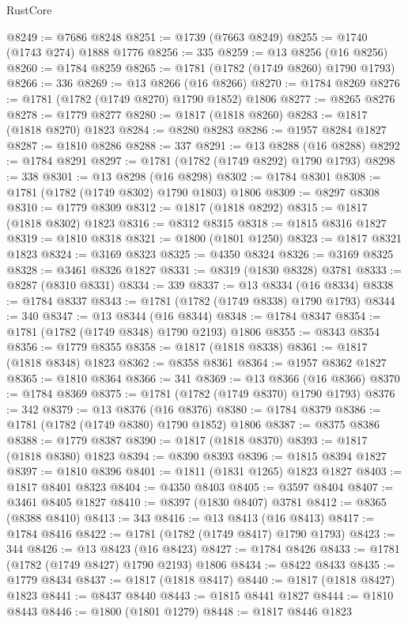 \begin{lexlean}{RustCore}
\begin{coremodule}
@8249 := @7686 @8248
@8251 := @1739 (@7663 @8249)
@8255 := @1740 (@1743 @274) @1888 @1776
@8256 := 335
@8259 := @13 @8256 (@16 @8256)
@8260 := @1784 @8259
@8265 := @1781 (@1782 (@1749 @8260) @1790 @1793)
@8266 := 336
@8269 := @13 @8266 (@16 @8266)
@8270 := @1784 @8269
@8276 := @1781 (@1782 (@1749 @8270) @1790 @1852) @1806
@8277 := @8265 @8276
@8278 := @1779 @8277
@8280 := @1817 (@1818 @8260)
@8283 := @1817 (@1818 @8270) @1823
@8284 := @8280 @8283
@8286 := @1957 @8284 @1827
@8287 := @1810 @8286
@8288 := 337
@8291 := @13 @8288 (@16 @8288)
@8292 := @1784 @8291
@8297 := @1781 (@1782 (@1749 @8292) @1790 @1793)
@8298 := 338
@8301 := @13 @8298 (@16 @8298)
@8302 := @1784 @8301
@8308 := @1781 (@1782 (@1749 @8302) @1790 @1803) @1806
@8309 := @8297 @8308
@8310 := @1779 @8309
@8312 := @1817 (@1818 @8292)
@8315 := @1817 (@1818 @8302) @1823
@8316 := @8312 @8315
@8318 := @1815 @8316 @1827
@8319 := @1810 @8318
@8321 := @1800 (@1801 @1250)
@8323 := @1817 @8321 @1823
@8324 := @3169 @8323
@8325 := @4350 @8324
@8326 := @3169 @8325
@8328 := @3461 @8326 @1827
@8331 := @8319 (@1830 @8328) @3781
@8333 := @8287 (@8310 @8331)
@8334 := 339
@8337 := @13 @8334 (@16 @8334)
@8338 := @1784 @8337
@8343 := @1781 (@1782 (@1749 @8338) @1790 @1793)
@8344 := 340
@8347 := @13 @8344 (@16 @8344)
@8348 := @1784 @8347
@8354 := @1781 (@1782 (@1749 @8348) @1790 @2193) @1806
@8355 := @8343 @8354
@8356 := @1779 @8355
@8358 := @1817 (@1818 @8338)
@8361 := @1817 (@1818 @8348) @1823
@8362 := @8358 @8361
@8364 := @1957 @8362 @1827
@8365 := @1810 @8364
@8366 := 341
@8369 := @13 @8366 (@16 @8366)
@8370 := @1784 @8369
@8375 := @1781 (@1782 (@1749 @8370) @1790 @1793)
@8376 := 342
@8379 := @13 @8376 (@16 @8376)
@8380 := @1784 @8379
@8386 := @1781 (@1782 (@1749 @8380) @1790 @1852) @1806
@8387 := @8375 @8386
@8388 := @1779 @8387
@8390 := @1817 (@1818 @8370)
@8393 := @1817 (@1818 @8380) @1823
@8394 := @8390 @8393
@8396 := @1815 @8394 @1827
@8397 := @1810 @8396
@8401 := @1811 (@1831 @1265) @1823 @1827
@8403 := @1817 @8401 @8323
@8404 := @4350 @8403
@8405 := @3597 @8404
@8407 := @3461 @8405 @1827
@8410 := @8397 (@1830 @8407) @3781
@8412 := @8365 (@8388 @8410)
@8413 := 343
@8416 := @13 @8413 (@16 @8413)
@8417 := @1784 @8416
@8422 := @1781 (@1782 (@1749 @8417) @1790 @1793)
@8423 := 344
@8426 := @13 @8423 (@16 @8423)
@8427 := @1784 @8426
@8433 := @1781 (@1782 (@1749 @8427) @1790 @2193) @1806
@8434 := @8422 @8433
@8435 := @1779 @8434
@8437 := @1817 (@1818 @8417)
@8440 := @1817 (@1818 @8427) @1823
@8441 := @8437 @8440
@8443 := @1815 @8441 @1827
@8444 := @1810 @8443
@8446 := @1800 (@1801 @1279)
@8448 := @1817 @8446 @1823

\end{coremodule}
\end{lexlean}
